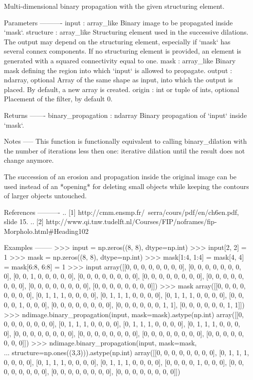 \begin{DoxyVerb}Multi-dimensional binary propagation with the given structuring element.

Parameters
----------
input : array_like
    Binary image to be propagated inside `mask`.
structure : array_like
    Structuring element used in the successive dilations. The output
    may depend on the structuring element, especially if `mask` has
    several connex components. If no structuring element is
    provided, an element is generated with a squared connectivity equal
    to one.
mask : array_like
    Binary mask defining the region into which `input` is allowed to
    propagate.
output : ndarray, optional
    Array of the same shape as input, into which the output is placed.
    By default, a new array is created.
origin : int or tuple of ints, optional
    Placement of the filter, by default 0.

Returns
-------
binary_propagation : ndarray
    Binary propagation of `input` inside `mask`.

Notes
-----
This function is functionally equivalent to calling binary_dilation
with the number of iterations less then one: iterative dilation until
the result does not change anymore.

The succession of an erosion and propagation inside the original image
can be used instead of an *opening* for deleting small objects while
keeping the contours of larger objects untouched.

References
----------
.. [1] http://cmm.ensmp.fr/~serra/cours/pdf/en/ch6en.pdf, slide 15.
.. [2] http://www.qi.tnw.tudelft.nl/Courses/FIP/noframes/fip-Morpholo.html#Heading102

Examples
--------
>>> input = np.zeros((8, 8), dtype=np.int)
>>> input[2, 2] = 1
>>> mask = np.zeros((8, 8), dtype=np.int)
>>> mask[1:4, 1:4] = mask[4, 4]  = mask[6:8, 6:8] = 1
>>> input
array([[0, 0, 0, 0, 0, 0, 0, 0],
       [0, 0, 0, 0, 0, 0, 0, 0],
       [0, 0, 1, 0, 0, 0, 0, 0],
       [0, 0, 0, 0, 0, 0, 0, 0],
       [0, 0, 0, 0, 0, 0, 0, 0],
       [0, 0, 0, 0, 0, 0, 0, 0],
       [0, 0, 0, 0, 0, 0, 0, 0],
       [0, 0, 0, 0, 0, 0, 0, 0]])
>>> mask
array([[0, 0, 0, 0, 0, 0, 0, 0],
       [0, 1, 1, 1, 0, 0, 0, 0],
       [0, 1, 1, 1, 0, 0, 0, 0],
       [0, 1, 1, 1, 0, 0, 0, 0],
       [0, 0, 0, 0, 1, 0, 0, 0],
       [0, 0, 0, 0, 0, 0, 0, 0],
       [0, 0, 0, 0, 0, 0, 1, 1],
       [0, 0, 0, 0, 0, 0, 1, 1]])
>>> ndimage.binary_propagation(input, mask=mask).astype(np.int)
array([[0, 0, 0, 0, 0, 0, 0, 0],
       [0, 1, 1, 1, 0, 0, 0, 0],
       [0, 1, 1, 1, 0, 0, 0, 0],
       [0, 1, 1, 1, 0, 0, 0, 0],
       [0, 0, 0, 0, 0, 0, 0, 0],
       [0, 0, 0, 0, 0, 0, 0, 0],
       [0, 0, 0, 0, 0, 0, 0, 0],
       [0, 0, 0, 0, 0, 0, 0, 0]])
>>> ndimage.binary_propagation(input, mask=mask,\\
... structure=np.ones((3,3))).astype(np.int)
array([[0, 0, 0, 0, 0, 0, 0, 0],
       [0, 1, 1, 1, 0, 0, 0, 0],
       [0, 1, 1, 1, 0, 0, 0, 0],
       [0, 1, 1, 1, 0, 0, 0, 0],
       [0, 0, 0, 0, 1, 0, 0, 0],
       [0, 0, 0, 0, 0, 0, 0, 0],
       [0, 0, 0, 0, 0, 0, 0, 0],
       [0, 0, 0, 0, 0, 0, 0, 0]])


\end{DoxyVerb}
